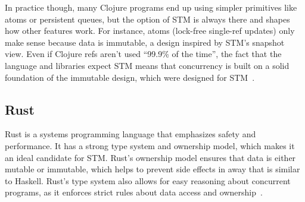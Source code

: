 In practice though, many Clojure programs end up using simpler primitives like atoms or persistent queues, but the option of STM is always there and shapes how other features work. For instance, atoms (lock-free single-ref updates) only make sense because data is immutable, a design inspired by STM’s snapshot view. Even if Clojure refs aren’t used “99.9\% of the time”, the fact that the language and libraries expect STM means that concurrency is built on a solid foundation of the immutable design, which were designed for STM~\cite{news.ycombinator.com}.

\subsection{Rust}
Rust is a systems programming language that emphasizes safety and performance. It has a strong type system and ownership model, which makes it an ideal candidate for STM. Rust's ownership model ensures that data is either mutable or immutable, which helps to prevent side effects in away that is similar to Haskell. Rust's type system also allows for easy reasoning about concurrent programs, as it enforces strict rules about data access and ownership~\cite{rustWiki}.
